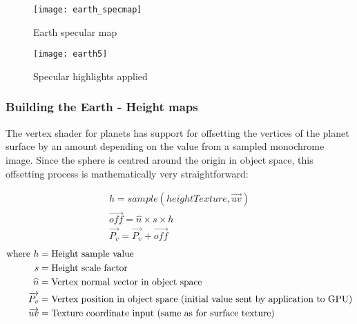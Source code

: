 \begin{figure}[!htbp]
\centering
\begin{minipage}{.5\textwidth}
  \centering
  \texttt{[image: earth\_specmap]}
  \caption{Earth specular map}
  \label{fig:earth5a}
\end{minipage}%
\begin{minipage}{.5\textwidth}
  \centering
  \texttt{[image: earth5]}
  \caption{Specular highlights applied}
  \label{fig:earth5b}
\end{minipage}
\end{figure}

\pagebreak
\subsubsection{Building the Earth - Height maps}
\label{heightmaps}

The vertex shader for planets has support for offsetting the vertices of the planet surface by an amount depending on the value from a sampled monochrome image. Since the sphere is centred around the origin in object space, this offsetting process is mathematically very straightforward:

\singlespacing
\vspace{-25pt}
\begin{align}
h = sample(heightTexture, \overrightarrow{uv}) \\
\overrightarrow{off} = \widehat{n} \times s \times h \\
\overrightarrow{P_v} = \overrightarrow{P_v} + \overrightarrow{off} 
\end{align}
\vspace{-10pt}
\begin{align*}
\text{where}~
h &= \text{Height sample value} \notag\\
s &= \text{Height scale factor} \notag\\
\widehat{n} &= \text{Vertex normal vector in object space} \notag\\
\overrightarrow{P_v} &= \text{Vertex position in object space (initial value sent by application to GPU)} \notag\\
\overrightarrow{uv} &= \text{Texture coordinate input (same as for surface texture)} \notag\\
\end{align*}
\vspace{-35pt}
\onehalfspacing

